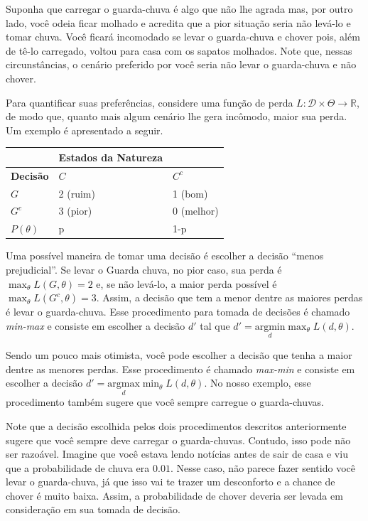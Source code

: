 \documentclass[
]{book}
\begin{document}
Suponha que carregar o guarda-chuva é algo que não lhe agrada mas, por outro lado, você odeia ficar molhado e acredita que a pior situação seria não levá-lo e tomar chuva. Você ficará incomodado se levar o guarda-chuva e chover pois, além de tê-lo carregado, voltou para casa com os sapatos molhados. Note que, nessas circunstâncias, o cenário preferido por você seria não levar o guarda-chuva e não chover.

Para quantificar suas preferências, considere uma função de perda \(L:\mathcal{D}\times\Theta\longrightarrow\mathbb{R}\), de modo que, quanto mais algum cenário lhe gera incômodo, maior sua perda. Um exemplo é apresentado a seguir.

\begin{longtable}[]{@{}lll@{}}
\toprule
& Estados da Natureza & \\
\midrule
\endhead
\textbf{Decisão} & \(C\) & \(C^c\) \\
\(G\) & 2 (ruim) & 1 (bom) \\
\(G^c\) & 3 (pior) & 0 (melhor) \\
\(P(\theta)\) & p & 1-p \\
\bottomrule
\end{longtable}

Uma possível maneira de tomar uma decisão é escolher a decisão ``menos prejudicial''. Se levar o Guarda chuva, no pior caso, sua perda é \(\displaystyle \max_\theta L(G,\theta)=2\) e, se não levá-lo, a maior perda possível é \(\displaystyle \max_\theta L(G^c,\theta)=3\). Assim, a decisão que tem a menor dentre as maiores perdas é levar o guarda-chuva. Esse procedimento para tomada de decisões é chamado \emph{min-max} e consiste em escolher a decisão \(d'\) tal que \(d' = \displaystyle \underset{d}{\text{argmin}} \max_\theta L(d,\theta)\).

Sendo um pouco mais otimista, você pode escolher a decisão que tenha a maior dentre as menores perdas. Esse procedimento é chamado \emph{max-min} e consiste em escolher a decisão \(d' = \displaystyle \underset{d}{\text{argmax}} \min_\theta L(d,\theta)\). No nosso exemplo, esse procedimento também sugere que você sempre carregue o guarda-chuvas.

Note que a decisão escolhida pelos dois procedimentos descritos anteriormente sugere que você sempre deve carregar o guarda-chuvas. Contudo, isso pode não ser razoável. Imagine que você estava lendo notícias antes de sair de casa e viu que a probabilidade de chuva era \(0.01\). Nesse caso, não parece fazer sentido você levar o guarda-chuva, já que isso vai te trazer um desconforto e a chance de chover é muito baixa. Assim, a probabilidade de chover deveria ser levada em consideração em sua tomada de decisão.
\end{document}

